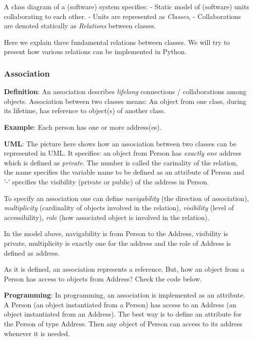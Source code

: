 \documentclass[11pt]{article}
\begin{document}
A class diagram of a (software) system specifies: - Static model of
(software) units collaborating to each other. - Units are represented as
\emph{Classes}, - Collaborations are denoted statically as
\emph{Relations} between classes.

Here we explain three fundamental relations between classes. We will try
to present how various relations can be implemented in Python.

    \subsubsection{Association}\label{association}

\textbf{Definition}: An association describes \emph{lifelong}
connections / collaborations among objects. Association between two
classes means: An object from one class, during its lifetime, has
reference to object(s) of another class.

\textbf{Example}: Each person has one or more address(es).

\textbf{UML}: The picture here shows how an association between two
classes can be represented in UML. It specifies: an object from Person
has \emph{exactly one} address which is defined as \emph{private}. The
number is called the carinality of the relation, the name specifies the
variable name to be defined as an attribute of Person and '-' specifies
the visibility (private or public) of the address in Person.

To specify an association one can define \emph{navigability} (the
direction of association), \emph{multiplicity} (cardinality of objects
involved in the relation), \emph{visibility} (level of accessibility),
\emph{role} (how associated object is involved in the relation).

In the model above, navigability is from Person to the Address,
visibility is private, multiplicity is exactly one for the address and
the role of Address is defined as address.

As it is defined, an association represents a reference. But, how an
object from a Person has access to objects from Address? Check the code
below.

\textbf{Programming}: In programming, an association is implemented as
an attribute. A Person (an object instantiated from a Person) has access
to an Address (an object instantiated from an Address). The best way is
to define an attribute for the Person of type Address. Then any object
of Person can access to its address whenever it is needed.
\end{document}
